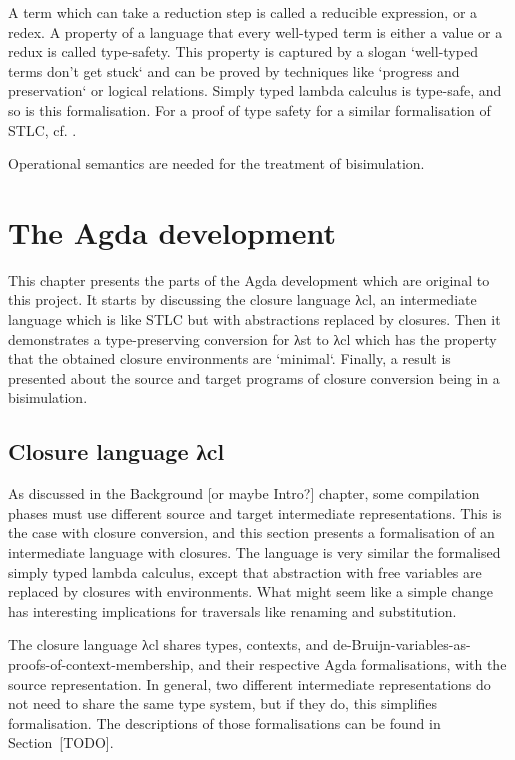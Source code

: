 \documentclass[bsc,frontabs,oneside,singlespacing,parskip,deptreport]{infthesis}
\theoremstyle{definition}
\begin{document}

A term which can take a reduction step is called a reducible
expression, or a redex. A property of a language that every well-typed
term is either a value or a redux is called type-safety. This property
is captured by a slogan `well-typed terms don't get stuck` and can be
proved by techniques like `progress and preservation` or logical
relations. Simply typed lambda calculus is type-safe, and so is this
formalisation. For a proof of type safety for a similar formalisation
of STLC, cf. \cite{DBLP:conf/sbmf/Wadler18}.

Operational semantics are needed for the treatment of bisimulation.

\chapter{The Agda development}
\label{cha:agda-development}

This chapter presents the parts of the Agda development which are
original to this project. It starts by discussing the closure language
λcl, an intermediate language which is like STLC but with abstractions
replaced by closures. Then it demonstrates a type-preserving
conversion for λst to λcl which has the property that the obtained
closure environments are `minimal`.  Finally, a result is presented
about the source and target programs of closure conversion being in a
bisimulation.

\section{Closure language λcl}
\label{sec:closure-language-cl}

As discussed in the Background [or maybe Intro?] chapter, some
compilation phases must use different source and target intermediate
representations. This is the case with closure conversion, and this
section presents a formalisation of an intermediate language with
closures. The language is very similar the formalised simply typed
lambda calculus, except that abstraction with free variables are
replaced by closures with environments. What might seem like a simple
change has interesting implications for traversals like renaming and
substitution.

The closure language λcl shares types, contexts, and
de-Bruijn-variables-as-proofs-of-context-membership, and their
respective Agda formalisations, with the source representation. In
general, two different intermediate representations do not need to
share the same type system, but if they do, this simplifies
formalisation. The descriptions of those formalisations can be found
in Section~[TODO].
\end{document}
